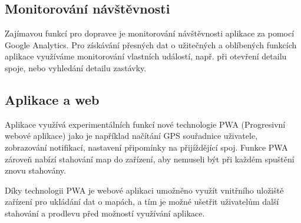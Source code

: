 \subsection{Monitorování návštěvnosti}
Zajímavou funkcí pro dopravce je monitorování návštěvnosti aplikace za pomocí Google Analytics. Pro získávání přesných dat o užitečných a oblíbených funkcích aplikace využíváme monitorování vlastních událostí, např. při otevření detailu spoje, nebo vyhledání detailu zastávky.
\subsection{Aplikace a web}
Aplikace využívá experimentálních funkcí nové technologie PWA (Progresivní webové aplikace) jako je například načítání GPS souřadnice uživatele, zobrazování notifikací, nastavení připomínky na přijíždějící spoj.
Funkce PWA zároveň nabízí stahování map do zařízení, aby nemuseli být při každém spuštění znovu stahovány.

Díky technologii PWA je webové aplikaci umožněno využít vnitřního uložiště zařízení pro ukládání dat o mapách, a tím je možné ušetřit uživatelům další stahování a prodlevu před možností využívání aplikace.
